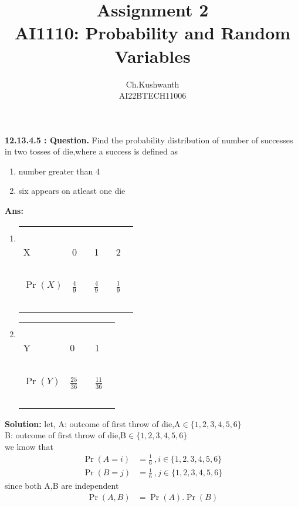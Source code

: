 \documentclass[journal,12pt,onecolumn]{IEEEtran}
\title{\textbf{Assignment 2}
\\ \textbf{AI1110:} Probability and Random Variables}
\author{Ch.Kushwanth
\\ AI22BTECH11006}
\providecommand{\pr}[1]{\ensuremath{\Pr\left(#1\right)}}
\theoremstyle{remark}
\begin{document}
\maketitle
\textbf{12.13.4.5 : Question.}
Find the probability \mbox{distribution} of number of successes in two tosses of die,where a success is defined as
\begin{enumerate}
\item number greater than 4
\item six appears on atleast one die
\end{enumerate}
\textbf{Ans:}
\begin{enumerate}
\item 
\begin{tabular}{|l|l|l|l|}
\hline 
\ & \ & \ & \\
\Large X & \Large 0 \  & \Large 1 \  & \Large 2 \ \\
\hline 
\ & \ & \ & \\
 \Large $\pr{X}$ &  \Large $\frac{4}{9}$ \  &  \Large $\frac{4}{9}$ \  &\Large $\frac{1}{9}$ \ \\
 \ & \ & \ & \\
\hline
\end{tabular}
\item
\begin{tabular}{|l|l|l|}
\hline 
\ & \ & \ \\
\Large Y & \Large 0 \  & \Large 1 \ \\
\hline 
\ & \ & \ \\
 \Large $\pr{Y}$ &  \Large $\frac{25}{36}$ \  &  \Large $\frac{11}{36}$ \  \\
 \ & \ & \ \\
\hline
\end{tabular}
\end{enumerate}
 \textbf{Solution:}
let, A: outcome of first throw of die,\mbox{A$\in \{1,2,3,4,5,6\}$}\\
B: outcome of first throw of die,\mbox{B$\in \{1,2,3,4,5,6\}$}\\
we know that
\begin{align}
\pr{A=i}&=\frac{1}{6}\ , i\in \{1,2,3,4,5,6\} \label{eq:v}\\
\pr{B=j}&=\frac{1}{6}\  ,j\in \{1,2,3,4,5,6\} \label{eq:n}
\end{align}
since both A,B are independent
\begin{align}
\pr{A,B}&=\pr{A}.\pr{B} \label{eq:t}
\end{align}
\end{document}
